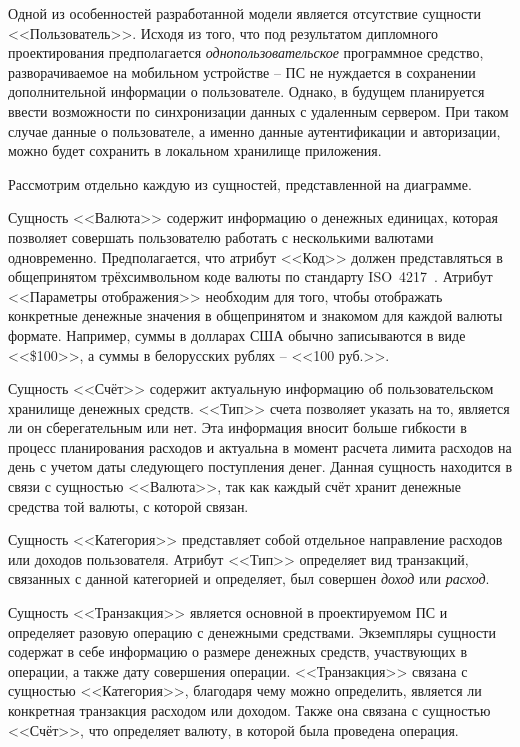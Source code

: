Одной из особенностей разработанной модели является отсутствие сущности <<Пользователь>>.
Исходя из того, что под результатом дипломного проектирования предполагается \emph{однопользовательское} программное средство, разворачиваемое на мобильном устройстве -- ПС не нуждается в сохранении дополнительной информации о пользователе.
Однако, в будущем планируется ввести возможности по синхронизации данных с удаленным сервером.
При таком случае данные о пользователе, а именно данные аутентификации и авторизации, можно будет сохранить в локальном хранилище приложения.

Рассмотрим отдельно каждую из сущностей, представленной на диаграмме.

Сущность <<Валюта>> содержит информацию о денежных единицах, которая позволяет совершать пользователю работать с несколькими валютами одновременно.
Предполагается, что атрибут <<Код>> должен представляться в общепринятом трёхсимвольном коде валюты по стандарту ISO~4217~\cite{iso_4217}.
Атрибут <<Параметры отображения>> необходим для того, чтобы отображать конкретные денежные значения в общепринятом и знакомом для каждой валюты формате. Например, суммы в долларах США обычно записываются в виде <<\$100>>, а суммы в белорусских рублях -- <<100 руб.>>.

Сущность <<Счёт>> содержит актуальную информацию об пользовательском хранилище денежных средств.
<<Тип>> счета позволяет указать на то, является ли он сберегательным или нет.
Эта информация вносит больше гибкости в процесс планирования расходов и актуальна в момент расчета лимита расходов на день с учетом даты следующего поступления денег.
Данная сущность находится в связи с сущностью <<Валюта>>, так как каждый счёт хранит денежные средства той валюты, с которой связан.

Сущность <<Категория>> представляет собой отдельное направление расходов или доходов пользователя.
Атрибут <<Тип>> определяет вид транзакций, связанных с данной категорией и определяет, был совершен \emph{доход} или \emph{расход}.

Сущность <<Транзакция>> является основной в проектируемом ПС и определяет разовую операцию с денежными средствами.
Экземпляры сущности содержат в себе информацию о размере денежных средств, участвующих в операции, а также дату совершения операции.
<<Транзакция>> связана с сущностью <<Категория>>, благодаря чему можно определить, является ли конкретная транзакция расходом или доходом.
Также она связана с сущностью <<Счёт>>, что определяет валюту, в которой была проведена операция.

